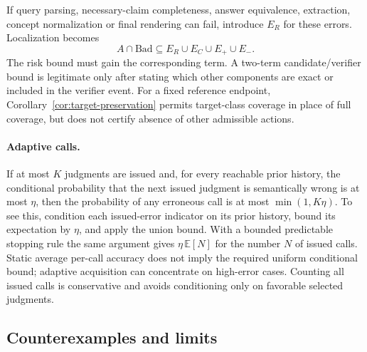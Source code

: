 If query parsing, necessary-claim completeness, answer equivalence, extraction,
concept normalization or final rendering can fail, introduce $E_R$ for these
errors. Localization becomes
\begin{equation}
 A\cap\mathrm{Bad}\subseteq E_R\cup E_C\cup E_+\cup E_-.
\end{equation}
The risk bound must gain the corresponding term. A two-term candidate/verifier
bound is legitimate only after stating which other components are exact or
included in the verifier event. For a fixed reference endpoint,
Corollary~\ref{cor:target-preservation} permits target-class coverage in place
of full coverage, but does not certify absence of other admissible actions.

\paragraph{Adaptive calls.}
If at most $K$ judgments are issued and, for every reachable prior history,
the conditional probability that the next issued judgment is semantically
wrong is at most $\eta$, then the probability of any erroneous call is at most
$\min(1,K\eta)$. To see this, condition each issued-error indicator on its
prior history, bound its expectation by $\eta$, and apply the union bound.
With a bounded predictable stopping rule the same argument gives
$\eta\,\mathbb E[N]$ for the number $N$ of issued calls. Static average
per-call accuracy does not imply the required uniform conditional bound;
adaptive acquisition can concentrate on high-error cases. Counting all issued
calls is conservative and avoids conditioning only on favorable selected
judgments.

\subsection{Counterexamples and limits}


